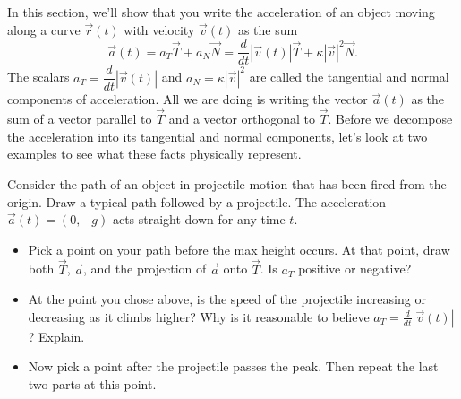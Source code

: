 In this section, we'll show that you write the acceleration of an object moving along a curve $\vec r(t)$ with velocity $\vec v(t)$ as the sum
$$\vec a(t) = a_T\vec T+a_N\vec N=\frac{d}{dt}|\vec v(t)| \vec T + \kappa |\vec v|^2 \vec N.$$
The scalars $a_T=\dfrac{d}{dt}|\vec v(t)|$ and $a_N=\kappa |\vec v|^2$ 
are called the tangential and normal components of acceleration.  All we are doing is writing the vector $\vec a(t)$ as the sum of a vector parallel to $\vec T$ and a vector orthogonal to $\vec T$. Before we decompose the acceleration into its tangential and normal components, let's look at two examples to see what these facts physically represent.

\begin{problem}
%
 Consider the path of an object in projectile motion that has been fired from the origin. Draw a typical path followed by a projectile.  The acceleration $\vec a(t)=(0,-g)$ acts straight down for any time $t$.  
\begin{itemize}
 \item Pick a point on your path before the max height occurs. At that point, draw both $\vec T$, $\vec a$, and the projection of $\vec a$ onto $\vec T$.  Is $a_T$ positive or negative? 
 \item At the point you chose above, is the speed of the projectile increasing or decreasing as it climbs higher? Why is it reasonable to believe $a_T = \frac{d}{dt}|\vec v(t)|$? Explain.
 \item Now pick a point after the projectile passes the peak.  Then repeat the last two parts at this point.
\end{itemize}
\end{problem}

